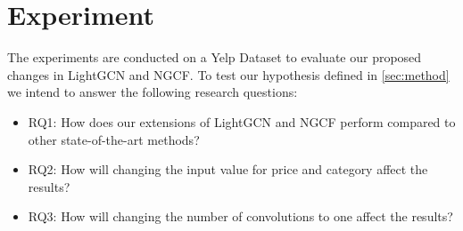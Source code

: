 \section{Experiment}\label{sec:experiment}
The experiments are conducted on a Yelp Dataset to evaluate our proposed changes in LightGCN and NGCF.
To test our hypothesis defined in \autoref{sec:method} we intend to answer the following research questions:
\begin{itemize}
    \item RQ1: How does our extensions of LightGCN and NGCF perform compared to other state-of-the-art methods?
    \item RQ2: How will changing the input value for price and category affect the results?
    \item RQ3: How will changing the number of convolutions to one affect the results?
\end{itemize}





